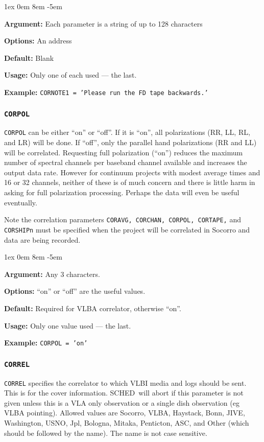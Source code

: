 \documentclass{report}
\newcommand{\schedb}{{\sc SCHED~}}
\newcommand{\rcwbox}[5]{
  \begin{list}{}{\parsep 1ex  \itemsep 0em
                 \leftmargin 8em  \itemindent -5em }
    \item {\bf Argument:} #1
    \item {\bf Options:}  #2
    \item {\bf Default:}  #3
    \item {\bf Usage:}    #4
    \item {\bf Example:}  #5
  \end{list}
}
\begin{document}
\rcwbox
{Each parameter is a string of up to 128 characters}
{An address}
{Blank}
{Only one of each used --- the last.}
{{\tt CORNOTE1 = 'Please run the FD tape backwards.' }}


\subsubsection{\label{MP:CORPOL}{\tt CORPOL}}

{\tt CORPOL} can be either ``on'' or ``off''.  If it is ``on'',
all polarizations (RR, LL, RL, and LR) will be done.  If ``off'',
only the parallel hand polarizations (RR and LL) will be correlated.
Requesting full polarization (``on'') reduces the maximum number
of spectral channels per baseband channel available and increases
the output data rate.  However for continuum projects with modest
average times and 16 or 32 channels, neither of these is of much
concern and there is little harm in asking for full polarization
processing.  Perhaps the data will even be useful eventually.

Note the correlation parameters {\tt CORAVG, CORCHAN,
CORPOL, CORTAPE,} and {\tt CORSHIPn} must be specified when
the project will be correlated in Socorro and data
are being recorded.

\rcwbox
{Any 3 characters.}
{``on'' or ``off'' are the useful values.}
{Required for VLBA correlator, otherwise ``on''.}
{Only one value used --- the last.}
{{\tt CORPOL = 'on'}}

\subsubsection{\label{MP:CORREL}{\tt CORREL}}

{\tt CORREL} specifies the correlator to which VLBI media and logs
should be sent. This is for the cover information.  \schedb will abort
if this parameter is not given unless this is a VLA only observation
or a single dish observation (eg VLBA pointing).  Allowed values are
Socorro, VLBA, Haystack, Bonn, JIVE, Washington, USNO, Jpl, Bologna,
Mitaka, Penticton, ASC,  and Other (which should be followed by the name).
The name is not case sensitive.
\end{document}
